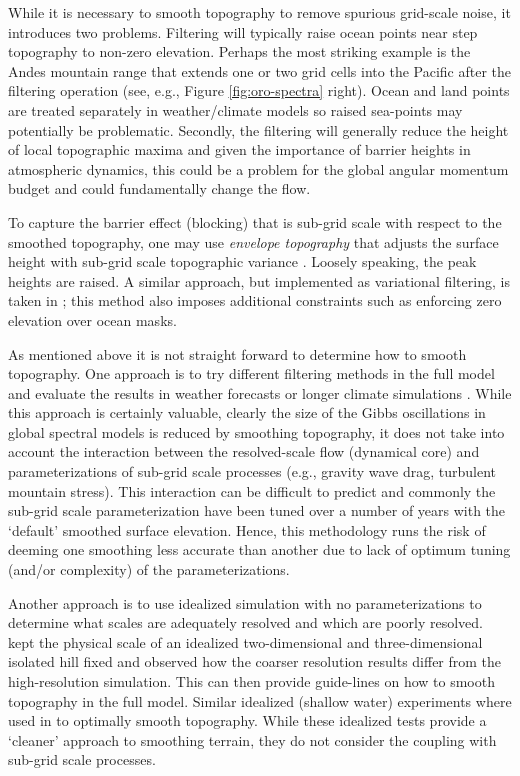 \documentclass[gmd]{copernicus}
\begin{document}
While it is necessary to smooth topography to remove spurious grid-scale noise, it introduces two problems. Filtering will typically raise ocean points near step topography to non-zero elevation. Perhaps the most striking example is the Andes mountain range that extends one or two grid cells into the Pacific after the filtering operation (see, e.g., Figure \ref{fig:oro-spectra} right). Ocean and land points are treated separately in weather/climate models so raised sea-points may potentially be problematic. Secondly, the filtering will generally reduce the height of local topographic maxima and given the importance of barrier heights in atmospheric dynamics, this could be a problem for the global angular momentum budget and could fundamentally change the flow. 

To capture the barrier effect (blocking) that is sub-grid scale with respect to the smoothed topography, one may use {\em{envelope topography}} that adjusts the surface height with sub-grid scale topographic variance \citep{WTS1983QJRMS}. Loosely speaking, the peak heights are raised. A similar approach, but implemented as variational filtering, is taken in \cite{RTS2006QJRMS}; this method also imposes additional constraints such as enforcing zero elevation over ocean masks.

As mentioned above it is not straight forward to determine how to smooth topography. One approach is to try different filtering methods in the full model and evaluate the results in weather forecasts or longer climate simulations \citep{NSM1994JC,B1995QJRMS,H1996JC}. While this approach is certainly valuable, clearly the size of the Gibbs oscillations in global spectral models is reduced by smoothing topography, it does not take into account the interaction between the resolved-scale flow (dynamical core) and parameterizations of sub-grid scale processes (e.g., gravity wave drag, turbulent mountain stress). This interaction can be difficult to predict and commonly the sub-grid scale parameterization have been tuned over a number of years with the `default' smoothed surface elevation. Hence, this methodology runs the risk of deeming one smoothing less accurate than another due to lack of optimum tuning (and/or complexity) of the parameterizations.

Another approach is to use idealized simulation with no parameterizations to determine what scales are adequately resolved and which are poorly resolved. \cite{DB2001QJRMS} kept the physical scale of an idealized two-dimensional and three-dimensional isolated hill fixed and observed how the coarser resolution results differ from the high-resolution simulation. This can then provide guide-lines on how to smooth topography in the full model. Similar idealized (shallow water) experiments where used in \cite{RTS2006QJRMS} to optimally smooth topography. While these idealized tests provide a `cleaner' approach to smoothing terrain, they do not consider the coupling with sub-grid scale processes.
\end{document}
